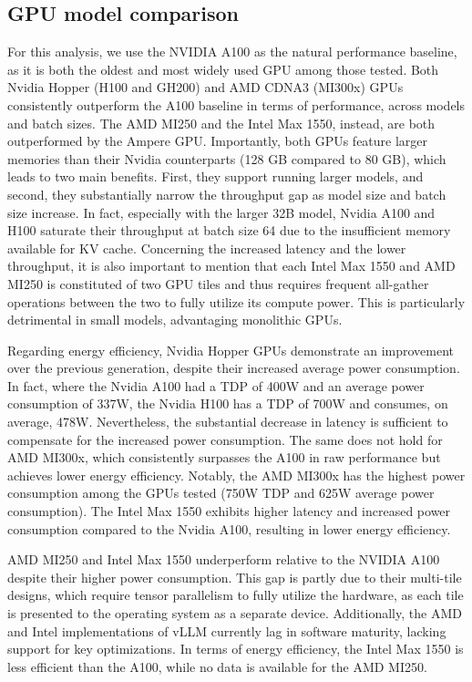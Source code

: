 \subsection{GPU model comparison}
For this analysis, we use the NVIDIA A100 as the natural performance baseline, as it is both the oldest and most widely used GPU among those tested. Both Nvidia Hopper (H100 and GH200) and AMD CDNA3 (MI300x) GPUs consistently outperform the A100 baseline in terms of performance, across models and batch sizes. The AMD MI250 and the Intel Max 1550, instead, are both outperformed by the Ampere GPU. Importantly, both GPUs feature larger memories than their Nvidia counterparts (128 GB compared to 80 GB), which leads to two main benefits. First, they support running larger models, and second, they substantially narrow the throughput gap as model size and batch size increase. In fact, especially with the larger 32B model, Nvidia A100 and H100 saturate their throughput at batch size 64 due to the insufficient memory available for KV cache.
Concerning the increased latency and the lower throughput, it is also important to mention that each Intel Max 1550 and AMD MI250 is constituted of two GPU tiles and thus requires frequent all-gather operations between the two to fully utilize its compute power. This is particularly detrimental in small models, advantaging monolithic GPUs.

Regarding energy efficiency, Nvidia Hopper GPUs demonstrate an improvement over the previous generation, despite their increased average power consumption. In fact, where the Nvidia A100 had a TDP of 400W and an average power consumption of 337W, the Nvidia H100 has a TDP of 700W and consumes, on average, 478W. Nevertheless, the substantial decrease in latency is sufficient to compensate for the increased power consumption.
The same does not hold for AMD MI300x, which consistently surpasses the A100 in raw performance but achieves lower energy efficiency. Notably, the AMD MI300x has the highest power consumption among the GPUs tested (750W TDP and 625W average power consumption).
The Intel Max 1550 exhibits higher latency and increased power consumption compared to the Nvidia A100, resulting in lower energy efficiency.

AMD MI250 and Intel Max 1550 underperform relative to the NVIDIA A100 despite their higher power consumption. This gap is partly due to their multi-tile designs, which require tensor parallelism to fully utilize the hardware, as each tile is presented to the operating system as a separate device. Additionally, the AMD and Intel implementations of vLLM currently lag in software maturity, lacking support for key optimizations. In terms of energy efficiency, the Intel Max 1550 is less efficient than the A100, while no data is available for the AMD MI250.

